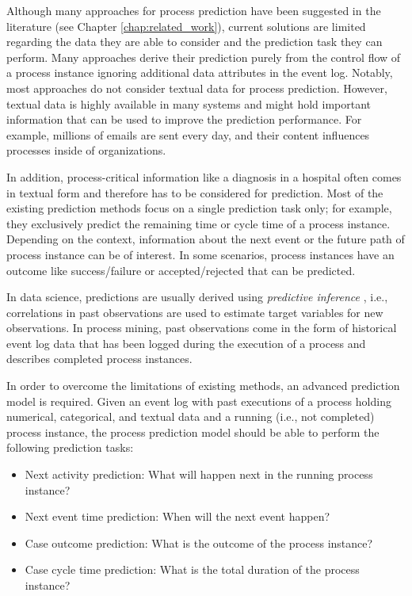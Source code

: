 Although many approaches for process prediction have been suggested in the literature (see Chapter \ref{chap:related_work}), current solutions are limited regarding the data they are able to consider and the prediction task they can perform.
Many approaches derive their prediction purely from the control flow of a process instance ignoring additional data attributes in the event log.
Notably, most approaches do not consider textual data for process prediction.
However, textual data is highly available in many systems and might hold important information that can be used to improve the prediction performance.
For example, millions of emails are sent every day, and their content influences processes inside of organizations.

In addition, process-critical information like a diagnosis in a hospital often comes in textual form and therefore has to be considered for prediction.
Most of the existing prediction methods focus on a single prediction task only; for example, they exclusively predict the remaining time or cycle time of a process instance.
Depending on the context, information about the next event or the future path of process instance can be of interest.
In some scenarios, process instances have an outcome like success/failure or accepted/rejected that can be predicted.

In data science, predictions are usually derived using \textit{predictive inference} \cite{predinf}, i.e., correlations in past observations are used to estimate target variables for new observations.
In process mining, past observations come in the form of historical event log data that has been logged during the execution of a process and describes completed process instances.

In order to overcome the limitations of existing methods, an advanced prediction model is required.
Given an event log with past executions of a process holding numerical, categorical, and textual data and a running (i.e., not completed) process instance, the process prediction model should be able to perform the following prediction tasks:

\begin{itemize}
	\item Next activity prediction: What will happen next in the running process instance?
	\item Next event time prediction: When will the next event happen?
	\item Case outcome prediction: What is the outcome of the process instance?
	\item Case cycle time prediction: What is the total duration of the process instance?
\end{itemize}

